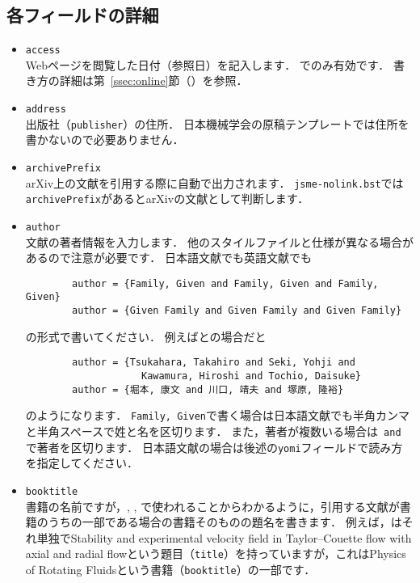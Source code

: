 \documentclass[a4paper,fleqn,uplatex,dvipdfmx]{jsarticle}
\newcommand{\jsmefile}{\texttt{jsme-nolink.bst}}
\begin{document}
\subsection{各フィールドの詳細}
\label{ssec:field}
\begin{itemize}
    \item \verb|access| \\
        Webページを閲覧した日付（参照日）を記入します．
        \ttonline でのみ有効です．
        書き方の詳細は第~\ref{ssec:online}節（\ttonline ）を参照．
    \item \verb|address| \\
        出版社（\verb|publisher|）の住所．
        日本機械学会の原稿テンプレートでは住所を書かないので必要ありません．
    \item \verb|archivePrefix| \\
        arXiv上の文献を引用する際に自動で出力されます．
        \jsmefile では\verb|archivePrefix|があるとarXivの文献として判断します．
    \item \verb|author| \\
        文献の著者情報を入力します．
        他の\BibTeX{}スタイルファイルと仕様が異なる場合があるので注意が必要です．
        日本語文献でも英語文献でも
        \begin{verbatim}
        author = {Family, Given and Family, Given and Family, Given}
        author = {Given Family and Given Family and Given Family}
        \end{verbatim}
        の形式で書いてください．
        例えば\citet{Tsukahara:TSFP2005}と\citet{堀本:可視化情報2020}の場合だと
        \begin{verbatim}
        author = {Tsukahara, Takahiro and Seki, Yohji and 
                    Kawamura, Hiroshi and Tochio, Daisuke}
        author = {堀本, 康文 and 川口, 靖夫 and 塚原, 隆裕}
        \end{verbatim}
        のようになります．
        \verb|Family, Given|で書く場合は日本語文献でも半角カンマと半角スペースで姓と名を区切ります．
        また，著者が複数いる場合は\verb| and |で著者を区切ります．
        日本語文献の場合は後述の\verb|yomi|フィールドで読み方を指定してください．
    \item \verb|booktitle| \\
        書籍の名前ですが，\ttconference, \ttincollection, \ttinproceedings で使われることからわかるように，引用する文献が書籍のうちの一部である場合の書籍そのものの題名を書きます．
        例えば，\citet{Lueptow:Springer2000}はそれ単独でStability and experimental velocity field in Taylor--Couette flow with axial and radial flowという題目（\verb|title|）を持っていますが，これはPhysics of Rotating Fluidsという書籍（\verb|booktitle|）の一部です．

\end{itemize}
\end{document}
